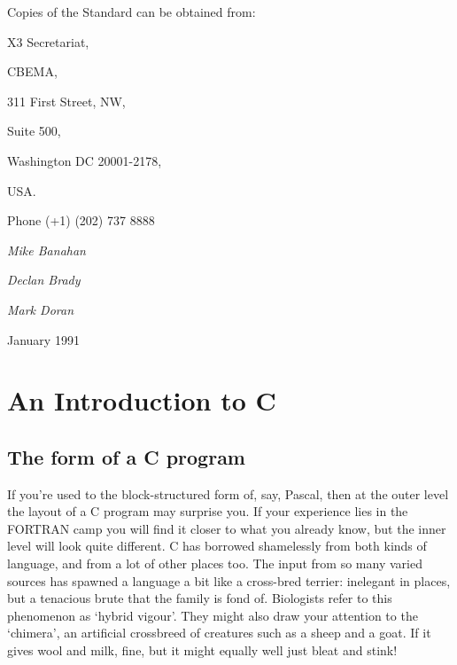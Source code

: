  

  

  Copies of the Standard can be obtained from:


  

   X3 Secretariat,

   CBEMA,

   311 First Street, NW,

   Suite 500,

   Washington DC 20001-2178,

   USA.

   Phone (+1) (202) 737 8888
  


  
   \begin{center}\textit{Mike Banahan}\end{center}



   \begin{center}\textit{Declan Brady}\end{center}



   \begin{center}\textit{Mark Doran}\end{center}



   

   January 1991
  

 \chapter{An Introduction to C}\label{chap:intro}


        \section{The form of a C program}
        

  

  If you're used to the block-structured form of, say, Pascal, then at the
   outer level the layout of a C program may surprise you. If your experience
   lies in the FORTRAN camp you will find it closer to what you already know,
   but the inner level will look quite different. C has borrowed shamelessly
   from both kinds of language, and from a lot of other places too. The input
   from so many varied sources has spawned a language a bit like a cross-bred
   terrier: inelegant in places, but a tenacious brute that the family is fond
   of.  Biologists refer to this phenomenon as `hybrid vigour'. They
   might also draw your attention to the `chimera', an artificial
   crossbreed of creatures such as a sheep and a goat. If it gives wool and
   milk, fine, but it might equally well just bleat and stink!


